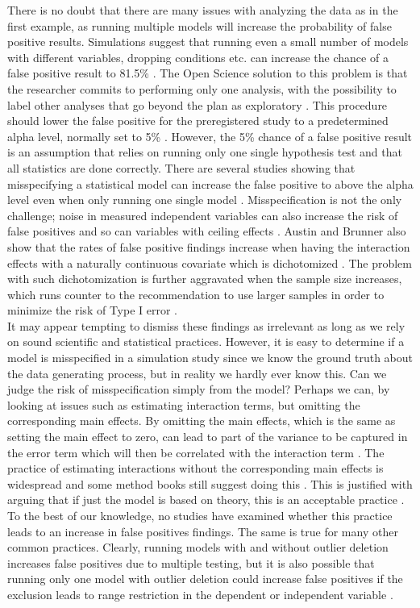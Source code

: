 There is no doubt that there are many issues with analyzing the data as in the first example, as running multiple models will increase the probability of false positive results. Simulations suggest that running even a small number of models with different variables, dropping conditions etc. can increase the chance of a false positive result to 81.5\% \citep{Simmons2011}. The Open Science solution to this problem is that the researcher commits to performing only one analysis, with the possibility to label other analyses that go beyond the plan as exploratory \citep{Nosek2018}. This procedure should lower the false positive for the preregistered study to a predetermined alpha level, normally set to 5\% \citep{Moore2016}. However, the 5\% chance of a false positive result is an assumption that relies on running only one single hypothesis test and that all statistics are done correctly. There are several studies showing that misspecifying a  statistical model can increase the false positive to above the alpha level even when only running one single model \citep{Dennis2019,Litiere2007}. Misspecification is not the only challenge; noise in measured independent variables can also increase the risk of false positives \citep{Brunner2009} and so can variables with ceiling effects \citep{Austin2003}. Austin and Brunner also show that the rates of false positive findings increase when having the interaction effects with a naturally continuous covariate which is dichotomized \citep{Austin2004}. The problem with such dichotomization is further aggravated when the sample size increases, which runs counter to the recommendation to use larger samples in order to minimize the risk of Type I error \citep{Simmons2011}. 
\\
It may appear tempting to dismiss these findings as irrelevant as long as we rely on sound scientific and statistical practices. However, it is easy to determine if a model is misspecified in a simulation study since we know the ground truth about the data generating process, but in reality we hardly ever know this. Can we judge the risk of misspecification simply from the model? Perhaps we can, by looking at issues such as estimating interaction terms, but omitting the corresponding main effects. By omitting the main effects, which is the same as setting the main effect to zero, can lead to part of the variance to be captured in the error term which will then be correlated with the interaction term \citep{Branbor2006}. The practice of estimating interactions without the corresponding main effects is widespread \citep{Branbor2006} and some method books still suggest doing this \citep{Cleves2008}. This is justified with arguing that if just the model is based on theory, this is an acceptable practice \citep{aiken1991multiple}. To the best of our knowledge, no studies have examined whether this practice leads to an increase in false positives findings. The same is true for many other common practices. Clearly, running models with and without outlier deletion increases false positives due to multiple testing, but it is also possible that running only one model with outlier deletion could increase false positives if the exclusion leads to range restriction in the dependent or independent variable \citep{Raju2003}. \\        
